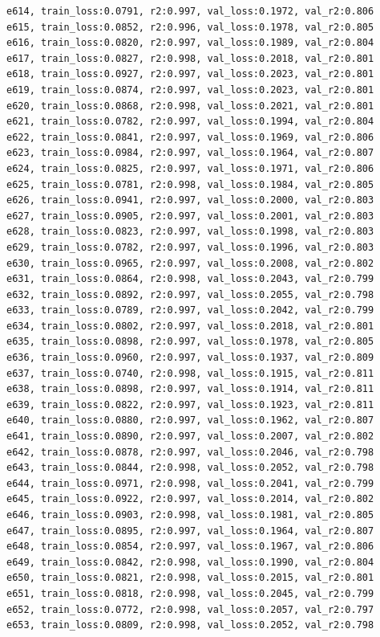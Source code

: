 \documentclass[a4paper, 12pt]{article}
\begin{document}
\begin{lstlisting}
e614, train_loss:0.0791, r2:0.997, val_loss:0.1972, val_r2:0.806
e615, train_loss:0.0852, r2:0.996, val_loss:0.1978, val_r2:0.805
e616, train_loss:0.0820, r2:0.997, val_loss:0.1989, val_r2:0.804
e617, train_loss:0.0827, r2:0.998, val_loss:0.2018, val_r2:0.801
e618, train_loss:0.0927, r2:0.997, val_loss:0.2023, val_r2:0.801
e619, train_loss:0.0874, r2:0.997, val_loss:0.2023, val_r2:0.801
e620, train_loss:0.0868, r2:0.998, val_loss:0.2021, val_r2:0.801
e621, train_loss:0.0782, r2:0.997, val_loss:0.1994, val_r2:0.804
e622, train_loss:0.0841, r2:0.997, val_loss:0.1969, val_r2:0.806
e623, train_loss:0.0984, r2:0.997, val_loss:0.1964, val_r2:0.807
e624, train_loss:0.0825, r2:0.997, val_loss:0.1971, val_r2:0.806
e625, train_loss:0.0781, r2:0.998, val_loss:0.1984, val_r2:0.805
e626, train_loss:0.0941, r2:0.997, val_loss:0.2000, val_r2:0.803
e627, train_loss:0.0905, r2:0.997, val_loss:0.2001, val_r2:0.803
e628, train_loss:0.0823, r2:0.997, val_loss:0.1998, val_r2:0.803
e629, train_loss:0.0782, r2:0.997, val_loss:0.1996, val_r2:0.803
e630, train_loss:0.0965, r2:0.997, val_loss:0.2008, val_r2:0.802
e631, train_loss:0.0864, r2:0.998, val_loss:0.2043, val_r2:0.799
e632, train_loss:0.0892, r2:0.997, val_loss:0.2055, val_r2:0.798
e633, train_loss:0.0789, r2:0.997, val_loss:0.2042, val_r2:0.799
e634, train_loss:0.0802, r2:0.997, val_loss:0.2018, val_r2:0.801
e635, train_loss:0.0898, r2:0.997, val_loss:0.1978, val_r2:0.805
e636, train_loss:0.0960, r2:0.997, val_loss:0.1937, val_r2:0.809
e637, train_loss:0.0740, r2:0.998, val_loss:0.1915, val_r2:0.811
e638, train_loss:0.0898, r2:0.997, val_loss:0.1914, val_r2:0.811
e639, train_loss:0.0822, r2:0.997, val_loss:0.1923, val_r2:0.811
e640, train_loss:0.0880, r2:0.997, val_loss:0.1962, val_r2:0.807
e641, train_loss:0.0890, r2:0.997, val_loss:0.2007, val_r2:0.802
e642, train_loss:0.0878, r2:0.997, val_loss:0.2046, val_r2:0.798
e643, train_loss:0.0844, r2:0.998, val_loss:0.2052, val_r2:0.798
e644, train_loss:0.0971, r2:0.998, val_loss:0.2041, val_r2:0.799
e645, train_loss:0.0922, r2:0.997, val_loss:0.2014, val_r2:0.802
e646, train_loss:0.0903, r2:0.998, val_loss:0.1981, val_r2:0.805
e647, train_loss:0.0895, r2:0.997, val_loss:0.1964, val_r2:0.807
e648, train_loss:0.0854, r2:0.997, val_loss:0.1967, val_r2:0.806
e649, train_loss:0.0842, r2:0.998, val_loss:0.1990, val_r2:0.804
e650, train_loss:0.0821, r2:0.998, val_loss:0.2015, val_r2:0.801
e651, train_loss:0.0818, r2:0.998, val_loss:0.2045, val_r2:0.799
e652, train_loss:0.0772, r2:0.998, val_loss:0.2057, val_r2:0.797
e653, train_loss:0.0809, r2:0.998, val_loss:0.2052, val_r2:0.798

\end{lstlisting}
\end{document}
